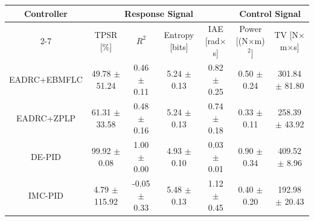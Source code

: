 \begin{tabular}{
    c | c | c | c | c | c | c 
}
    \multirow{2}{*}{Controller} &
    \multicolumn{4}{c}{Response Signal} &
    \multicolumn{2}{|c}{Control Signal} \\
    \cline{2-7}
    &
    TPSR [\%] & 
    $R^2$ & 
    Entropy [bits] & 
    IAE [rad$\times$s] & 
    Power [(N$\times$m)$^2$] & 
    TV [N$\times$m$\times$s] 
\\
    \hline
EADRC+EBMFLC & 49.78 $\pm$ 51.24 & 0.46 $\pm$ 0.11 & 5.24 $\pm$ 0.13 & 0.82 $\pm$ 0.25 & 0.50 $\pm$ 0.24 & 301.84 $\pm$ 81.80 \\
EADRC+ZPLP & 61.31 $\pm$ 33.58 & 0.48 $\pm$ 0.16 & 5.24 $\pm$ 0.13 & 0.74 $\pm$ 0.18 & 0.33 $\pm$ 0.11 & 258.39 $\pm$ 43.92 \\
DE-PID & 99.92 $\pm$ 0.08 & 1.00 $\pm$ 0.00 & 4.93 $\pm$ 0.10 & 0.03 $\pm$ 0.01 & 0.90 $\pm$ 0.34 & 409.52 $\pm$ 8.96 \\
IMC-PID & 4.79 $\pm$ 115.92 & -0.05 $\pm$ 0.33 & 5.48 $\pm$ 0.13 & 1.12 $\pm$ 0.45 & 0.40 $\pm$ 0.20 & 192.98 $\pm$ 20.43 \\
\end{tabular}
